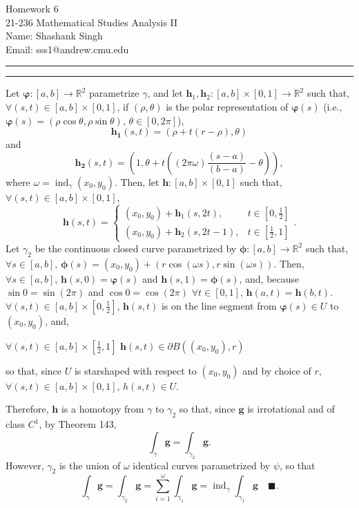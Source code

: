 \documentclass[11pt]{article}
\makeatletter
\newcounter{questionCounter}
\newcounter{partCounter}[questionCounter]
\newenvironment{question}[2][\arabic{questionCounter}]{%
    \setcounter{partCounter}{0}%
    \vspace{.25in} \hrule \vspace{0.5em}%
        \noindent{\bf #2}%
    \vspace{0.8em} \hrule \vspace{.10in}%
    \addtocounter{questionCounter}{1}%
}{}
\newcommand{\myname}{Shashank Singh}
\newcommand{\myandrew}{sss1@andrew.cmu.edu}
\newcommand{\myclass}{21-236 Mathematical Studies Analysis II}
\newcommand{\myhwnum}{6}
\makeatother
\begin{document}
\thispagestyle{plain}

{\Large Homework \myhwnum} \\
\myclass \\
Name: \myname \\
Email: \myandrew \\
\begin{question}{Problem 1}
Let $\boldsymbol{\varphi}: [a,b] \rightarrow \mathbb{R}^2$ parametrize
$\gamma$, and let
$\mathbf{h}_1,\mathbf{h}_2: [a,b] \times [0,1] \rightarrow \mathbb{R}^2$ such
that, $\forall (s,t) \in [a,b] \times [0,1]$, if $(\rho,\theta)$ is the polar
representation of $\boldsymbol{\varphi}(s)$ (i.e.,
$\boldsymbol{\varphi}(s) = (\rho \cos \theta, \rho \sin \theta)$, $\theta \in [0,2\pi]$),
\[\mathbf{h_1}(s,t) = (\rho + t(r - \rho), \theta)\]
and
\[\mathbf{h_2}(s,t) =
\left(1,
\theta + t\left((2 \pi \omega)\frac{(s - a)}{(b - a)} - \theta\right)\right)
,\]
where $\omega = \operatorname{ind}_{\gamma}(x_0,y_0)$.
Then, let $\mathbf{h}:[a,b] \times [0,1]$ such that,
$\forall (s,t) \in [a,b] \times [0,1]$,
\[\mathbf{h}(s,t) =
  \left\{
    \begin{array}{cc}
      (x_0,y_0) + \mathbf{h}_1(s,2t), & t \in \left[0,\frac12\right] \\
      (x_0,y_0) + \mathbf{h}_2(s,2t - 1), & t \in \left[\frac12,1\right]
    \end{array}
  \right.
.\]
Let $\gamma_2$ be the continuous closed curve parametrized by
$\boldsymbol{\phi}: [a,b] \rightarrow \mathbb{R}^2$ such that,
$\forall s \in [a,b]$,
$\boldsymbol{\phi}(s) = (x_0,y_0) + (r \cos(\omega s), r \sin(\omega s))$.
Then, $\forall s \in [a,b]$, $\mathbf{h}(s,0) = \boldsymbol{\varphi}(s)$ and
$\mathbf{h}(s,1) = \boldsymbol{\phi}(s)$, and, because $\sin 0 = \sin(2\pi)$
and $\cos 0 = \cos(2\pi)$ $\forall t \in [0,1]$,
$\mathbf{h}(a,t) = \mathbf{h}(b,t)$.
$\forall (s,t) \in [a,b] \times [0,\frac12]$, $\mathbf{h}(s,t)$ is on the line segment
from $\boldsymbol{\varphi}(s) \in U$ to $(x_0,y_0)$, and,

$\forall (s,t) \in [a,b] \times [\frac12,1]$ $\mathbf{h}(s,t) \in \partial B((x_0,y_0),r)$

so that, since $U$ is starshaped with respect to $(x_0,y_0)$ and by choice of
$r$, $\forall (s,t) \in [a,b] \times [0,1]$, $h(s,t) \in U$.

Therefore,
$\mathbf{h}$ is a homotopy from $\gamma$ to $\gamma_2$ so that, since
$\mathbf{g}$ is irrotational and of class $C^1$, by Theorem 143,
\[\int_{\gamma} \mathbf{g} = \int_{\gamma_2} \mathbf{g}.\]
However, $\gamma_2$ is the union of $\omega$ identical curves parametrized by
$\psi$, so that
\[\int_{\gamma} \mathbf{g}
 = \int_{\gamma_2} \mathbf{g}
 = \sum_{i = 1}^{\omega} \int_{\gamma_1} \mathbf{g}
 = \operatorname{ind}_{\gamma}\int_{\gamma_1} \mathbf{g}
\quad \blacksquare.\]


\end{question}
\end{document}
